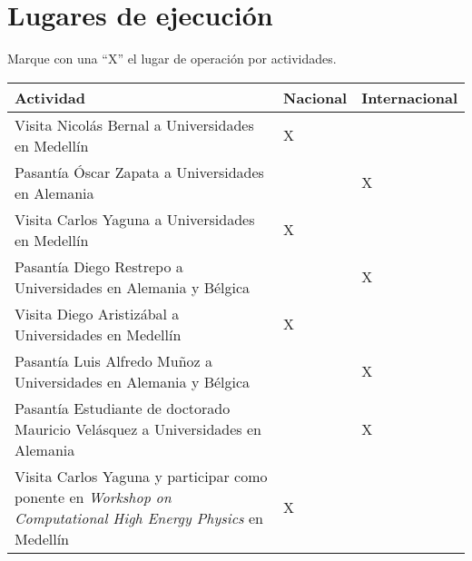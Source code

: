 
\section{Lugares de ejecución}
\begin{instrucciones}
Marque con una “X” el lugar de operación por actividades.  
\end{instrucciones}

\begin{tabular}{|p{10cm}|l|l|}\hline
  Actividad                           & Nacional & Internacional \\\hline
Visita Nicolás Bernal a Universidades 
en Medellín                           & X        &               \\\hline
Pasantía Óscar Zapata a Universidades 
en Alemania                           &          & X             \\\hline
Visita Carlos Yaguna a Universidades 
en Medellín                           & X        &               \\\hline
Pasantía Diego Restrepo a Universidades 
en Alemania y Bélgica                 &          & X             \\\hline
Visita Diego Aristizábal a Universidades 
en Medellín                           & X        &               \\\hline
Pasantía Luis Alfredo Muñoz a Universidades 
en Alemania y Bélgica                 &          & X             \\\hline
Pasantía Estudiante de doctorado  
Mauricio Velásquez a Universidades 
en Alemania                           &          & X             \\\hline
Visita Carlos Yaguna y participar como 
ponente en 
\emph{Workshop on Computational High Energy Physics}
en Medellín                          & X        &               \\\hline
\end{tabular}


